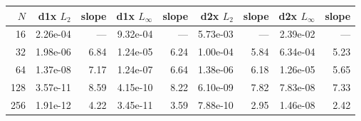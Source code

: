 \begin{tabular}{rrrrrrrrr}
\toprule
$N$ & d1x $L_2$ & slope & d1x $L_\infty$ & slope & d2x $L_2$ & slope & d2x $L_\infty$ & slope \\
\midrule
16 & 2.26e-04 & --- & 9.32e-04 & --- & 5.73e-03 & --- & 2.39e-02 & --- \\
32 & 1.98e-06 & 6.84 & 1.24e-05 & 6.24 & 1.00e-04 & 5.84 & 6.34e-04 & 5.23 \\
64 & 1.37e-08 & 7.17 & 1.24e-07 & 6.64 & 1.38e-06 & 6.18 & 1.26e-05 & 5.65 \\
128 & 3.57e-11 & 8.59 & 4.15e-10 & 8.22 & 6.10e-09 & 7.82 & 7.83e-08 & 7.33 \\
256 & 1.91e-12 & 4.22 & 3.45e-11 & 3.59 & 7.88e-10 & 2.95 & 1.46e-08 & 2.42 \\
\bottomrule
\end{tabular}

